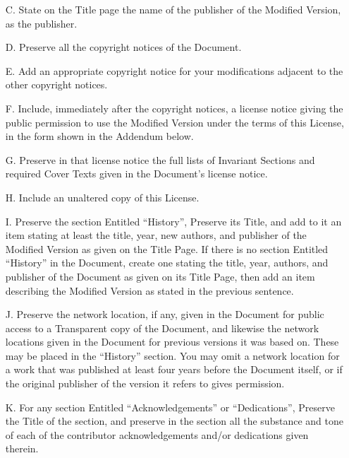 \begin{scriptsize}
\begin{multicols}{2}
\begin{itemize}
    \item[C.]
      State on the Title page the name of the publisher of the Modified Version, as the publisher.
   
    \item[D.]
      Preserve all the copyright notices of the Document.
   
    \item[E.]
      Add an appropriate copyright notice for your modifications adjacent to the other copyright notices.
   
    \item[F.]
      Include, immediately after the copyright notices, a license notice giving the public permission to use the Modified Version under the terms of this License, in the form shown in the Addendum below.
   
    \item[G.]
      Preserve in that license notice the full lists of Invariant Sections and required Cover Texts given in the Document's license notice.
   
    \item[H.]
      Include an unaltered copy of this License.
   
    \item[I.]
      Preserve the section Entitled ``History'', Preserve its Title, and add to it an item stating at least the title, year, new authors, and publisher of the Modified Version as given on the Title Page. If there is no section Entitled ``History'' in the Document, create one stating the title, year, authors, and publisher of the Document as given on its Title Page, then add an item describing the Modified Version as stated in the previous sentence.
   
    \item[J.]
      Preserve the network location, if any, given in the Document for public access to a Transparent copy of the Document, and likewise the network locations given in the Document for previous versions it was based on.  These may be placed in the ``History'' section. You may omit a network location for a work that was published at least four years before the Document itself, or if the original publisher of the version it refers to gives permission.
   
    \item[K.]
      For any section Entitled ``Acknowledgements'' or ``Dedications'', Preserve the Title of the section, and preserve in the section all the substance and tone of each of the contributor acknowledgements and/or dedications given therein.
   

\end{itemize}
\end{multicols}
\end{scriptsize}
